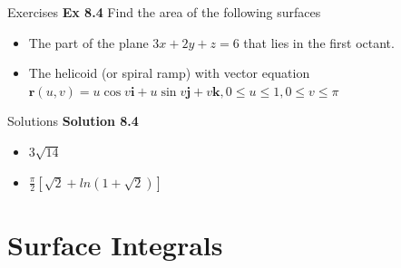 \documentclass[aspectratio=169]{beamer}
\begin{document}
\begin{frame}{Exercises}
    \textbf{Ex 8.4} Find the area of the following surfaces
    \begin{itemize}
        \item The part of the plane $3x+2y+z=6$ that lies in the first octant.
        \item The helicoid (or spiral ramp) with vector equation $\boldsymbol{r}(u,v)=u\cos{v}\boldsymbol{i}+u\sin{v}\boldsymbol{j}+v\boldsymbol{k},0\leq u\leq 1,0\leq v\leq\pi$
    \end{itemize}
    
\end{frame}

\begin{frame}{Solutions}
\textbf{Solution 8.4}
\begin{itemize}
    \item $3\sqrt{14}$
    \item $\frac{\pi}{2}[\sqrt{2}+ln(1+\sqrt{2})]$
\end{itemize}
    
\end{frame}

\section{Surface Integrals}
\end{document}
